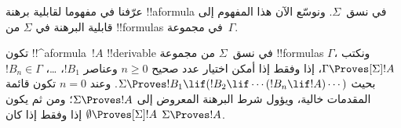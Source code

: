 \documentclass[../../../include/open-logic-section]{subfiles}
\begin{document}


عرّفنا في  مفهوما لقابلية برهنة !!a{formula}
في نسق~$\Sigma$. ونوسّع الآن هذا المفهوم إلى قابلية البرهنة في
$\Sigma$ من !!{formula}s في مجموعة~$\Gamma$.

\begin{defn}
  تكون !!^a{formula}~$!A$ !!{derivable} في نسق~$\Sigma$ من مجموعة
  !!{formula}s $\Gamma$، ونكتب $\Gamma \Proves[\Sigma] !A$، إذا
  وفقط إذا أمكن اختيار عدد صحيح $n \geq 0$ وعناصر $!B_1$، \dots،
  $!B_n \in \Gamma$ بحيث
  $\Sigma \Proves !B_1 \lif (!B_2 \lif \cdots (!B_n \lif !A)
  \cdots)$.
  وعند $n=0$ تكون قائمة المقدمات خالية، ويؤول شرط البرهنة المعروض إلى
  $\Sigma \Proves !A$؛ ومن ثم يكون
  $\emptyset \Proves[\Sigma] !A$ إذا وفقط إذا كان $\Sigma \Proves !A$.
\end{defn}
\end{document}
